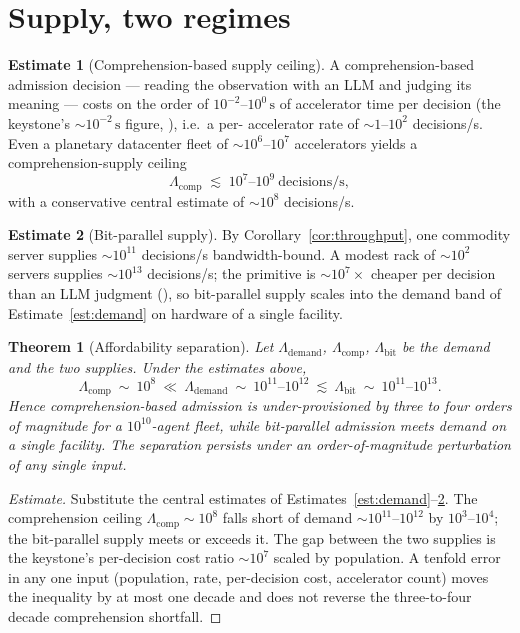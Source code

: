 \documentclass[11pt,oneside]{book}
\theoremstyle{definition}
\newtheorem{estimate}{Estimate}[chapter]
\theoremstyle{plain}
\newtheorem{theorem}{Theorem}[chapter]
\theoremstyle{remark}
\begin{document}
\section{Supply, two regimes}

\begin{estimate}[Comprehension-based supply ceiling]\label{est:comp-supply}
A comprehension-based admission decision --- reading the observation with an LLM and judging its
meaning --- costs on the order of $10^{-2}$--$10^{0}\,\mathrm{s}$ of accelerator time per decision
(the keystone's $\sim\!10^{-2}\,\mathrm{s}$ figure, \cite[Prop.~6.2]{keystone}), i.e.\ a per-
accelerator rate of $\sim\!1$--$10^{2}$ decisions/s. Even a planetary datacenter fleet of
$\sim\!10^{6}$--$10^{7}$ accelerators yields a comprehension-supply ceiling
\[
\Lambda_{\text{comp}}\;\lesssim\;10^{7}\text{--}10^{9}\ \text{decisions/s},
\]
with a conservative central estimate of $\sim\!10^{8}$ decisions/s.
\end{estimate}

\begin{estimate}[Bit-parallel supply]\label{est:bit-supply}
By Corollary~\ref{cor:throughput}, one commodity server supplies $\sim\!10^{11}$ decisions/s
bandwidth-bound. A modest rack of $\sim\!10^{2}$ servers supplies $\sim\!10^{13}$ decisions/s;
the primitive is $\sim\!10^{7}\times$ cheaper per decision than an LLM judgment
(\cite[Prop.~6.2]{keystone}), so bit-parallel supply scales into the demand band of
Estimate~\ref{est:demand} on hardware of a single facility.
\end{estimate}

\begin{theorem}[Affordability separation]\label{thm:afford}
Let $\Lambda_{\text{demand}}$, $\Lambda_{\text{comp}}$, $\Lambda_{\text{bit}}$ be the demand and
the two supplies. Under the estimates above,
\[
\Lambda_{\text{comp}}\ \sim\ 10^{8}\ \ll\ \Lambda_{\text{demand}}\ \sim\ 10^{11}\text{--}10^{12}\ \lesssim\ \Lambda_{\text{bit}}\ \sim\ 10^{11}\text{--}10^{13}.
\]
Hence comprehension-based admission is under-provisioned by three to four orders of magnitude for
a $10^{10}$-agent fleet, while bit-parallel admission meets demand on a single facility. The
separation persists under an order-of-magnitude perturbation of any single input.
\end{theorem}

\begin{proof}[Estimate]
Substitute the central estimates of Estimates~\ref{est:demand}--\ref{est:bit-supply}. The
comprehension ceiling $\Lambda_{\text{comp}}\sim 10^{8}$ falls short of demand
$\sim\!10^{11}$--$10^{12}$ by $10^{3}$--$10^{4}$; the bit-parallel supply meets or exceeds it. The
gap between the two supplies is the keystone's per-decision cost ratio $\sim\!10^{7}$ scaled by
population. A tenfold error in any one input (population, rate, per-decision cost, accelerator
count) moves the inequality by at most one decade and does not reverse the three-to-four decade
comprehension shortfall.
\end{proof}
\end{document}
